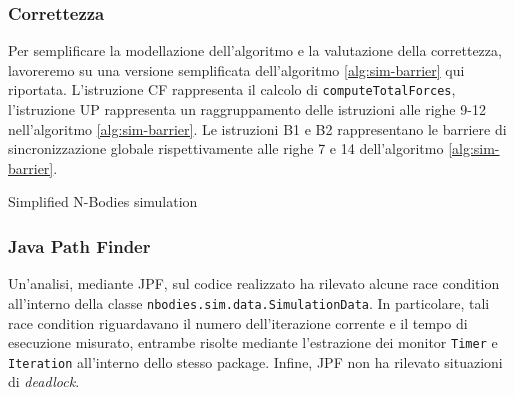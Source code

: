 \documentclass[12pt,a4paper,oneside]{article}
\begin{document}
	\subsubsection{Correttezza}
	\begin{minipage}{.55\textwidth}
		Per semplificare la modellazione dell'algoritmo e la valutazione della correttezza, lavoreremo su una versione semplificata dell'algoritmo \ref{alg:sim-barrier} qui riportata. L'istruzione CF rappresenta il calcolo di \texttt{computeTotalForces}, l'istruzione UP rappresenta un raggruppamento delle istruzioni alle righe 9-12 nell'algoritmo \ref{alg:sim-barrier}. Le istruzioni B1 e B2 rappresentano le barriere di sincronizzazione globale rispettivamente alle righe 7 e 14 dell'algoritmo \ref{alg:sim-barrier}.
	\end{minipage}
	\hfill
	\begin{minipage}{.4\textwidth}
		\begin{algorithm}[H]
			\caption{Simplified N-Bodies simulation}
		\end{algorithm}
	\end{minipage}
	\hfill
	
	\subsubsection{Java Path Finder}
	Un'analisi, mediante JPF, sul codice realizzato ha rilevato alcune race condition all'interno della classe \texttt{nbodies.sim.data.SimulationData}. In particolare, tali race condition riguardavano il numero dell'iterazione corrente e il tempo di esecuzione misurato, entrambe risolte mediante l'estrazione dei monitor \texttt{Timer} e \texttt{Iteration} all'interno dello stesso package. Infine, JPF non ha rilevato situazioni di \textit{deadlock}.
	
	\iffalse
\end{document}
